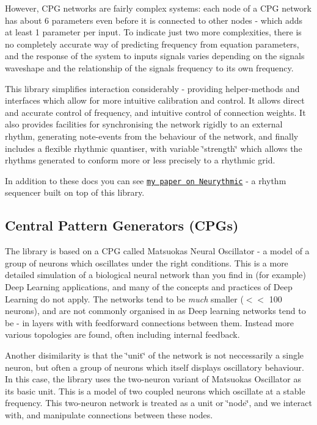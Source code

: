 However, C\+PG networks are fairly complex systems\+: each node of a C\+PG network has about 6 parameters even before it is connected to other nodes -\/ which adds at least 1 parameter per input. To indicate just two more complexities, there is no completely accurate way of predicting frequency from equation parameters, and the response of the system to inputs signals varies depending on the signal\textquotesingle{}s waveshape and the relationship of the signal\textquotesingle{}s frequency to its own frequency.

This library simplifies interaction considerably -\/ providing helper-\/methods and interfaces which allow for more intuitive calibration and control. It allows direct and accurate control of frequency, and intuitive control of connection weights. It also provides facilities for synchronising the network rigidly to an external rhythm, generating note-\/events from the behaviour of the network, and finally includes a flexible rhythmic quantiser, with variable \char`\"{}strength\char`\"{} which allows the rhythms generated to conform more or less precisely to a rhythmic grid.

In addition to these docs you can see \href{http://www.nime.org/proceedings/2018/nime2018_paper0047.pdf}{\tt my paper on Neurythmic} -\/ a rhythm sequencer built on top of this library.

\subsection*{Central Pattern Generators (C\+P\+Gs)}

The library is based on a C\+PG called Matsuoka\textquotesingle{}s Neural Oscillator -\/ a model of a group of neurons which oscillates under the right conditions. This is a more detailed simulation of a biological neural network than you find in (for example) Deep Learning applications, and many of the concepts and practices of Deep Learning do not apply. The networks tend to be {\itshape much} smaller ($<$$<$ 100 neurons), and are not commonly organised in as Deep learning networks tend to be -\/ in layers with with feedforward connections between them. Instead more various topologies are found, often including internal feedback.

Another disimilarity is that the \char`\"{}unit\char`\"{} of the network is not neccessarily a single neuron, but often a group of neurons which itself displays oscillatory behaviour. In this case, the library uses the two-\/neuron variant of Matsuoka\textquotesingle{}s Oscillator as its basic unit. This is a model of two coupled neurons which oscillate at a stable frequency. This two-\/neuron network is treated as a unit or \char`\"{}node\char`\"{}, and we interact with, and manipulate connections between these nodes.

